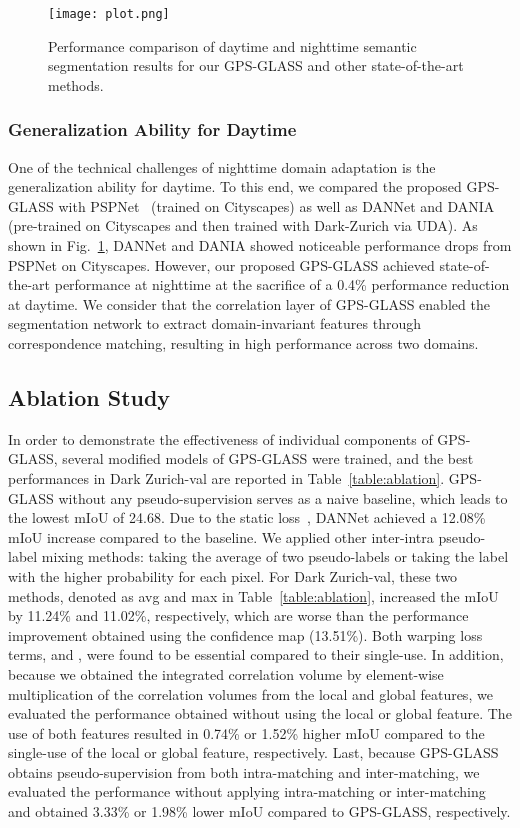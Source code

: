 \documentclass[10pt,twocolumn,letterpaper]{article}
\begin{document}
\begin{figure}[t]
  \centering
  \texttt{[image: plot.png]}
  \caption{Performance comparison of daytime and nighttime semantic segmentation results for our GPS-GLASS and other state-of-the-art methods.}
  \label{figure:city_result}
\end{figure}

\subsubsection{Generalization Ability for Daytime}
One of the technical challenges of nighttime domain adaptation is the generalization ability for daytime. To this end, we compared the proposed GPS-GLASS with PSPNet~\cite{zhao2017pyramid} (trained on Cityscapes) as well as DANNet and DANIA (pre-trained on Cityscapes and then trained with Dark-Zurich via UDA). As shown in Fig.~\ref{figure:city_result}, DANNet and DANIA showed noticeable performance drops from PSPNet on Cityscapes. However, our proposed GPS-GLASS achieved state-of-the-art performance at nighttime at the sacrifice of a 0.4\% performance reduction at daytime. We consider that the correlation layer of GPS-GLASS enabled the segmentation network to extract domain-invariant features through correspondence matching, resulting in high performance across two domains.



\subsection{Ablation Study}
In order to demonstrate the effectiveness of individual components of GPS-GLASS, several modified models of GPS-GLASS were trained, and the best performances in Dark Zurich-val are reported in Table~\ref{table:ablation}. GPS-GLASS without any pseudo-supervision serves as a naive baseline, which leads to the lowest mIoU of 24.68. Due to the static loss~\cite{wu2021dannet}, DANNet achieved a 12.08\% mIoU increase compared to the baseline. We applied other inter-intra pseudo-label mixing methods: taking the average of two pseudo-labels or taking the label with the higher probability for each pixel. For Dark Zurich-val, these two methods, denoted as avg and max in Table~\ref{table:ablation}, increased the mIoU by 11.24\% and 11.02\%, respectively, which are worse than the performance improvement obtained using the confidence map (13.51\%). Both warping loss terms,  and , were found to be essential compared to their single-use. In addition, because we obtained the integrated correlation volume by element-wise multiplication of the correlation volumes from the local and global features, we evaluated the performance obtained without using the local or global feature. The use of both features resulted in 0.74\% or 1.52\% higher mIoU compared to the single-use of the local or global feature, respectively. Last, because GPS-GLASS obtains pseudo-supervision from both intra-matching and inter-matching, we evaluated the performance without applying intra-matching or inter-matching and obtained 3.33\% or 1.98\% lower mIoU compared to GPS-GLASS, respectively. 
\end{document}
